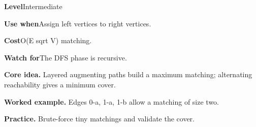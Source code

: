 \documentclass[10pt,letterpaper]{article}
\newcommand{\entrylabel}[1]{\textcolor{accent}{\bfseries #1}}
\begin{document}
\begin{guidebox}\small
\entrylabel{Level}\quad Intermediate\par
\entrylabel{Use when}\quad Assign left vertices to right vertices.\par
\entrylabel{Cost}\quad O(E sqrt V) matching.\par
\entrylabel{Watch for}\quad The DFS phase is recursive.\par
\end{guidebox}
\noindent\textbf{Core idea.} Layered augmenting paths build a maximum matching; alternating reachability gives a minimum cover.\par
\noindent\textbf{Worked example.} Edges 0-a, 1-a, 1-b allow a matching of size two.\par
\noindent\textbf{Practice.} Brute-force tiny matchings and validate the cover.\par
\end{document}
